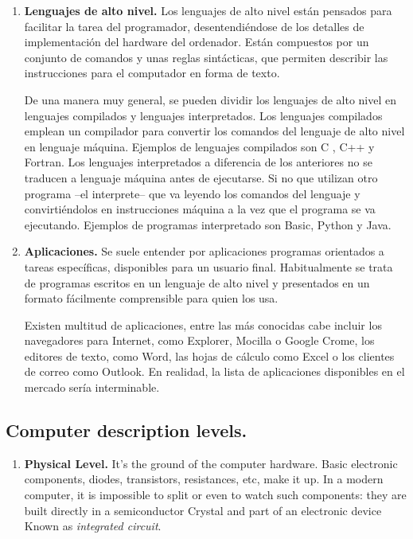 \begin{paracol}{2}
\begin{enumerate}
\item \textbf{Lenguajes de alto nivel.} 
Los lenguajes de alto nivel están pensados para facilitar la tarea del programador, desentendiéndose de los detalles de implementación del hardware del ordenador.  Están compuestos por un conjunto de comandos y unas reglas sintácticas, que permiten describir las instrucciones para el computador en forma de texto.

De una manera muy general, se pueden dividir los lenguajes de alto nivel en lenguajes compilados y lenguajes interpretados. Los lenguajes compilados emplean un compilador para convertir los comandos del lenguaje de alto nivel en lenguaje máquina. Ejemplos de lenguajes compilados son C , C++ y Fortran. Los lenguajes interpretados a diferencia de los anteriores no se traducen a lenguaje máquina antes de ejecutarse. Si no que utilizan otro programa --el interprete-- que va leyendo los comandos del lenguaje y convirtiéndolos en instrucciones máquina a la vez que el programa se va ejecutando. Ejemplos de programas interpretado son Basic, Python y Java.

\item \textbf{Aplicaciones.}  Se suele entender por aplicaciones programas orientados a tareas específicas, disponibles para un usuario final. Habitualmente se trata de programas escritos en un lenguaje de alto nivel y presentados en un formato fácilmente comprensible para quien los usa.

Existen multitud de aplicaciones, entre las más conocidas cabe incluir los navegadores para Internet, como Explorer, Mocilla o Google Crome, los editores de texto, como Word, las hojas de cálculo como Excel o los clientes de correo como Outlook. En realidad, la lista de aplicaciones disponibles en el mercado sería interminable. 
\end{enumerate}

\switchcolumn
\subsection{Computer description levels.}
\begin{enumerate}
\item \textbf{Physical Level.} It's the ground of the computer hardware. Basic electronic components, diodes, transistors, resistances, etc, make it up. In a modern computer, it is impossible to split or even to watch such components: they are built directly in a semiconductor Crystal and part\; of an electronic device Known as \emph{integrated circuit}.


\end{enumerate}
\end{paracol}
